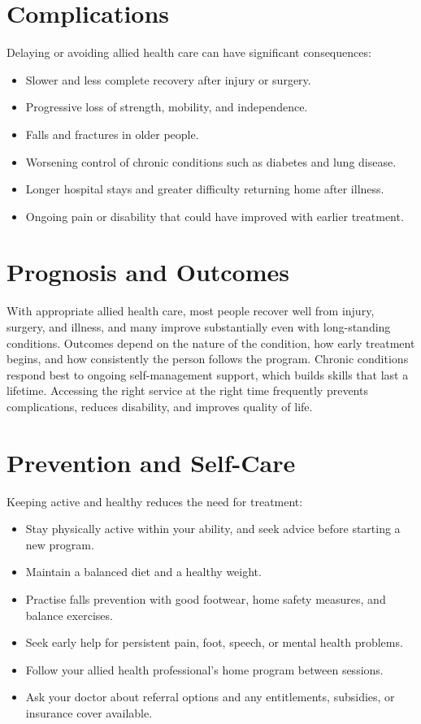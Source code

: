 \section*{Complications}
Delaying or avoiding allied health care can have significant consequences:

\begin{itemize}
    \item Slower and less complete recovery after injury or surgery.
    \item Progressive loss of strength, mobility, and independence.
    \item Falls and fractures in older people.
    \item Worsening control of chronic conditions such as diabetes and lung disease.
    \item Longer hospital stays and greater difficulty returning home after illness.
    \item Ongoing pain or disability that could have improved with earlier treatment.
\end{itemize}

\section*{Prognosis and Outcomes}
With appropriate allied health care, most people recover well from injury, surgery, and illness, and many improve substantially even with long-standing conditions. Outcomes depend on the nature of the condition, how early treatment begins, and how consistently the person follows the program. Chronic conditions respond best to ongoing self-management support, which builds skills that last a lifetime. Accessing the right service at the right time frequently prevents complications, reduces disability, and improves quality of life.

\section*{Prevention and Self-Care}
Keeping active and healthy reduces the need for treatment:

\begin{itemize}
    \item Stay physically active within your ability, and seek advice before starting a new program.
    \item Maintain a balanced diet and a healthy weight.
    \item Practise falls prevention with good footwear, home safety measures, and balance exercises.
    \item Seek early help for persistent pain, foot, speech, or mental health problems.
    \item Follow your allied health professional's home program between sessions.
    \item Ask your doctor about referral options and any entitlements, subsidies, or insurance cover available.
\end{itemize}

